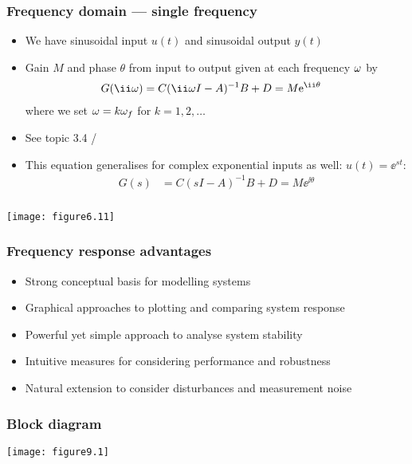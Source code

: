 \documentclass{beamer-control}
\begin{document}
\begin{frame}
\frametitle{Frequency domain --- single frequency}
\begin{itemize}
\item We have sinusoidal input $u(t)$ and sinusoidal output $y(t)$
\item Gain $M$ and phase $\theta$ from input to output given at each frequency $\omega$ by
\begin{align}
G(\ii\ww) &= C(\ii\ww I - A)^{-1}B + D = M\ee^{\ii\theta}
\end{align}
where we set $\omega=k \omega_f$ for $k=1,2,\dots$
\item See topic 3.4 / 
\item \alert{This equation generalises for complex exponential inputs as well: $u(t) = \ee^{st}$:
\begin{align}
G(s) &= C(s I - A)^{-1}B + D = M\ee^{\ii\theta}
\end{align}
}
\end{itemize}

\end{frame}

\begin{frame}
\frametitle{}
\texttt{[image: figure6.11]}

\end{frame}

\begin{frame}
\frametitle{Frequency response advantages}

\begin{itemize}
\item Strong conceptual basis for modelling systems
\item Graphical approaches to plotting and comparing system response
\item Powerful yet simple approach to analyse system stability
\item Intuitive measures for considering performance and robustness
\item Natural extension to consider disturbances and measurement noise
\end{itemize}

\end{frame}

\begin{frame}
\frametitle{Block diagram}

\texttt{[image: figure9.1]}


\end{frame}
\end{document}
